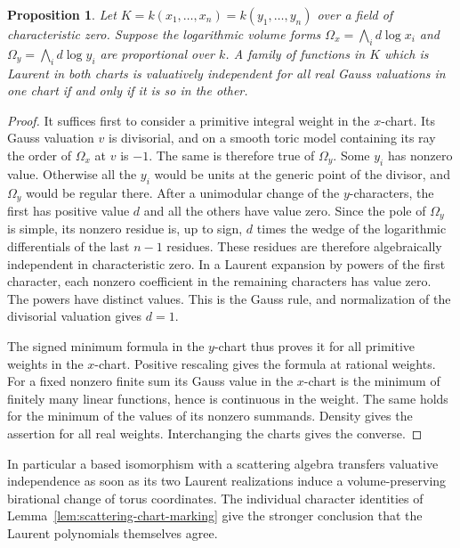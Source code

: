 \documentclass[11pt,reqno]{amsart}
\numberwithin{equation}{section}
\newtheorem{proposition}[theorem]{Proposition}
\theoremstyle{definition}
\theoremstyle{remark}
\begin{document}
\begin{proposition}\label{prop:volume-transfer}
Let \(K=k(x_1,\ldots,x_n)=k(y_1,\ldots,y_n)\) over a field of
characteristic zero. Suppose the logarithmic volume forms
\(\Omega_x=\bigwedge_i d\log x_i\) and
\(\Omega_y=\bigwedge_i d\log y_i\) are proportional over \(k\).
A family of functions in \(K\) which is Laurent in both charts
is valuatively independent for all real Gauss valuations in one
chart if and only if it is so in the other.
\end{proposition}

\begin{proof}
It suffices first to consider a primitive integral weight in the
\(x\)-chart. Its Gauss valuation \(v\) is divisorial, and on a
smooth toric model containing its ray the order of \(\Omega_x\)
at \(v\) is \(-1\). The same is therefore true of \(\Omega_y\).
Some \(y_i\) has nonzero value. Otherwise all the \(y_i\) would
be units at the generic point of the divisor, and \(\Omega_y\)
would be regular there. After a unimodular change of the \(y\)-characters,
the first has positive value \(d\) and all the others have value zero.
Since the pole of \(\Omega_y\) is simple, its nonzero residue is,
up to sign, \(d\) times the wedge of the logarithmic differentials
of the last \(n-1\) residues. These residues are therefore algebraically
independent in characteristic zero. In a Laurent expansion by powers
of the first character, each nonzero coefficient in the remaining
characters has value zero. The powers have distinct values. This is
the Gauss rule, and normalization of the divisorial valuation gives
\(d=1\).

The signed minimum formula in the \(y\)-chart thus proves it for
all primitive weights in the \(x\)-chart. Positive rescaling gives
the formula at rational weights. For a fixed nonzero finite sum its
Gauss value in the \(x\)-chart is the minimum of finitely many
linear functions, hence is continuous in the weight. The same holds
for the minimum of the values of its nonzero summands. Density
gives the assertion for all real weights. Interchanging the charts
gives the converse.
\end{proof}

In particular a based isomorphism with a scattering algebra transfers
valuative independence as soon as its two Laurent realizations induce
a volume-preserving birational change of torus coordinates. The
individual character identities of
Lemma~\ref{lem:scattering-chart-marking} give the stronger conclusion
that the Laurent polynomials themselves agree.
\end{document}

